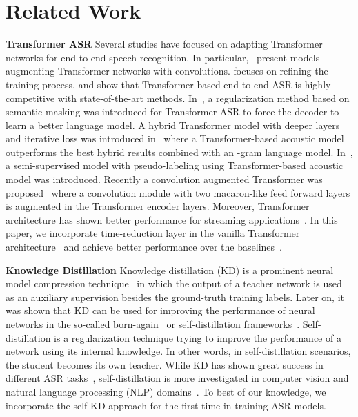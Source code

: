 \documentclass{article}
\begin{document}
\section{Related Work}
\label{sec:prior}

\textbf{Transformer ASR}
Several studies have focused on adapting Transformer networks for end-to-end speech recognition. In particular,~\citep{dong2018speech,mohamed2019transformers} present models augmenting Transformer networks with convolutions. \citep{karita2019asru} focuses on refining the training process, and show that Transformer-based end-to-end ASR is highly competitive with state-of-the-art methods. In~\citep{wang2020a}, a regularization method based on semantic masking was introduced for Transformer  ASR to force the decoder to learn a better language model. A hybrid Transformer model with deeper layers  and iterative loss was introduced in~\citep{wang2020b} where a Transformer-based acoustic model outperforms the best hybrid results  combined with an -gram language model. In~\citep{e2e2020}, a semi-supervised model with pseudo-labeling using Transformer-based acoustic model was introduced. Recently a convolution augmented Transformer was proposed~\citep{conformer} where a convolution module with two macaron-like feed forward layers is augmented in the Transformer encoder layers. Moreover, Transformer architecture has shown better performance for streaming applications~\citep{transducer,moritz2020,sony}. In this paper, we incorporate  time-reduction layer in the vanilla Transformer architecture~\citep{vaswani2017attention, karita2019asru} and achieve better performance over the baselines~\citep{karita2019asru,wang2020a,wang2020b,moritz2020,e2e2020,specaugment}.       

\textbf{Knowledge Distillation} 
Knowledge distillation (KD) is a prominent neural model compression technique~\citep{hinton2015distilling} in which the output of a teacher network is used as an auxiliary supervision besides the ground-truth training labels. Later on, it was shown that KD can be used for improving the performance of neural networks in the so-called born-again~\citep{furlanello2018born} or self-distillation frameworks~\citep{selfkdgeneralization,yun2020regularizing,hahn2019self}. Self-distillation is a regularization technique trying to improve the performance of a network using its internal knowledge. In other words, in self-distillation scenarios, the student becomes its own teacher. 
While KD has shown great success in different ASR tasks~\citep{kdasra,kdasrb,kdasrc,kdasrd,kdasre,kdasrf,kdasrg}, self-distillation is more investigated in computer vision and natural language processing (NLP) domains~\citep{selfkdnlp,hahn2019self}. 
To best of our knowledge, we incorporate the self-KD approach for the first time in training ASR models. 
\end{document}
